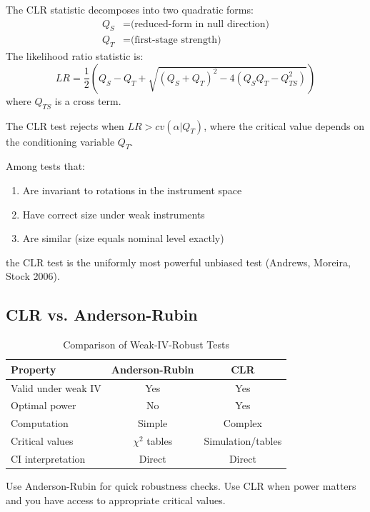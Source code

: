 \begin{definition}
\label{def:clr}
The CLR statistic decomposes into two quadratic forms:
\begin{align*}
Q_S &= \text{(reduced-form in null direction)} \\
Q_T &= \text{(first-stage strength)}
\end{align*}
The likelihood ratio statistic is:
\[
LR = \frac{1}{2}\left(Q_S - Q_T + \sqrt{(Q_S + Q_T)^2 - 4(Q_S Q_T - Q_{TS}^2)}\right)
\]
where $Q_{TS}$ is a cross term.
\end{definition}

The CLR test rejects when $LR > cv(\alpha | Q_T)$, where the critical value depends on the conditioning variable $Q_T$.

\begin{theorem}
\label{thm:clr_optimal}
Among tests that:
\begin{enumerate}
    \item Are invariant to rotations in the instrument space
    \item Have correct size under weak instruments
    \item Are similar (size equals nominal level exactly)
\end{enumerate}
the CLR test is the uniformly most powerful unbiased test (Andrews, Moreira, Stock 2006).
\end{theorem}

\subsection{CLR vs. Anderson-Rubin}

\begin{table}[htbp]
\centering
\caption{Comparison of Weak-IV-Robust Tests}
\label{tab:ar_vs_clr}
\begin{tabular}{lcc}
\toprule
Property & Anderson-Rubin & CLR \\
\midrule
Valid under weak IV & Yes & Yes \\
Optimal power & No & Yes \\
Computation & Simple & Complex \\
Critical values & $\chi^2$ tables & Simulation/tables \\
CI interpretation & Direct & Direct \\
\bottomrule
\end{tabular}
\end{table}

\begin{insight}
Use Anderson-Rubin for quick robustness checks. Use CLR when power matters and you have access to appropriate critical values.
\end{insight}


